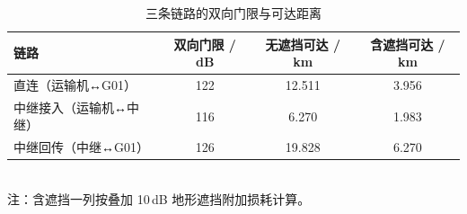 \begin{table}[htbp]
\caption{三条链路的双向门限与可达距离}
\label{tab:link_thresholds}
\centering
{}
\setlength{\tabcolsep}{4pt}
\begin{tabular}{lccc}
\toprule
链路 & 双向门限 / dB & 无遮挡可达 / km & 含遮挡可达 / km \\
\midrule
直连（运输机↔G01） & 122 & 12.511 & 3.956 \\
中继接入（运输机↔中继） & 116 & 6.270 & 1.983 \\
中继回传（中继↔G01） & 126 & 19.828 & 6.270 \\
\bottomrule
\end{tabular}
\\[2pt] \footnotesize 注：含遮挡一列按叠加 10\,dB 地形遮挡附加损耗计算。
\end{table}
